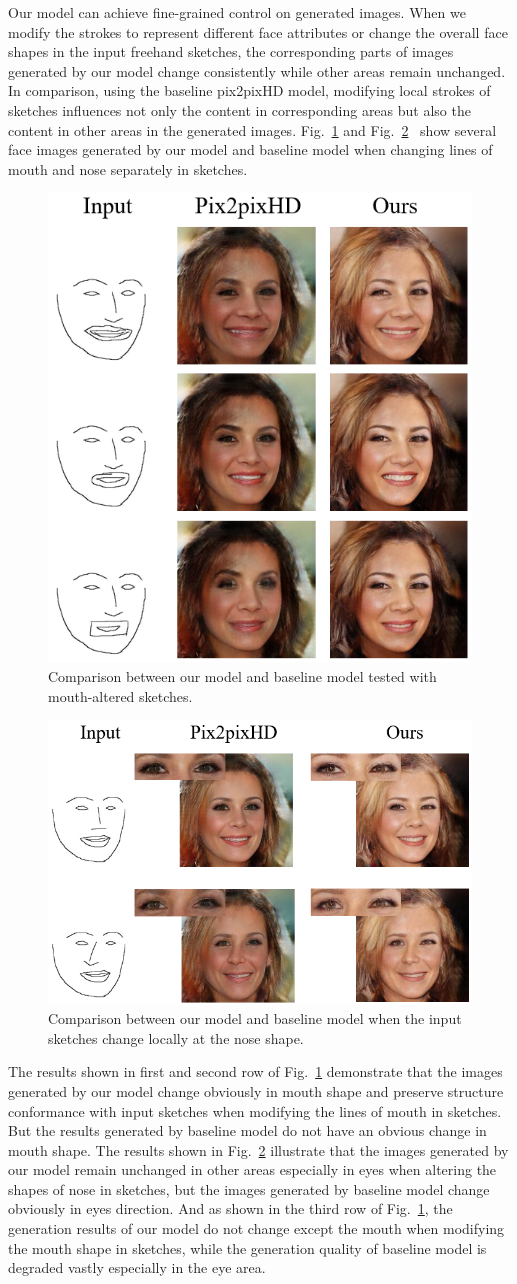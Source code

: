 \documentclass{article}
\begin{document}
Our model can achieve fine-grained control on generated images. 
When we modify the strokes to represent different face attributes or change the overall face shapes in the input freehand sketches, the corresponding parts of images generated by our model change consistently while other areas remain unchanged. 
In comparison, using the baseline pix2pixHD model, modifying local strokes of sketches influences not only the content in corresponding areas but also the content in other areas in the generated images. 
Fig.~\ref{fig:compare_2} and Fig.~\ref{fig:compare_3}~ show several face images generated by our model and baseline model when changing lines of mouth and nose separately in sketches.
\begin{figure}[htb]
	\centering
	\includegraphics[width=0.4 \textwidth]{mouth_editing.png}
	\caption{Comparison between our model and baseline model tested with mouth-altered sketches. }
	\label{fig:compare_2}
\end{figure}
\begin{figure}[htb]
	\centering
	\includegraphics[width=0.45 \textwidth]{nose_editing.png}
	\caption{Comparison between our model and baseline model when the input sketches change locally at the nose shape.}
	\label{fig:compare_3}
\end{figure}
The results shown in first and second row of Fig.~\ref{fig:compare_2} demonstrate that the images generated by our model change obviously in mouth shape and preserve structure conformance with input sketches when modifying the lines of mouth in sketches. 
But the results generated by baseline model do not have an obvious change in mouth shape.
The results shown in Fig.~\ref{fig:compare_3} illustrate that the images generated by our model remain unchanged in other areas especially in eyes when altering the shapes of nose in sketches, but the images generated by baseline model change obviously in eyes direction. 
And as shown in the third row of Fig.~\ref{fig:compare_2}, the generation results of our model do not change except the mouth when modifying the mouth shape in sketches, while the generation quality of baseline model is degraded vastly especially in the eye area. 
\end{document}
